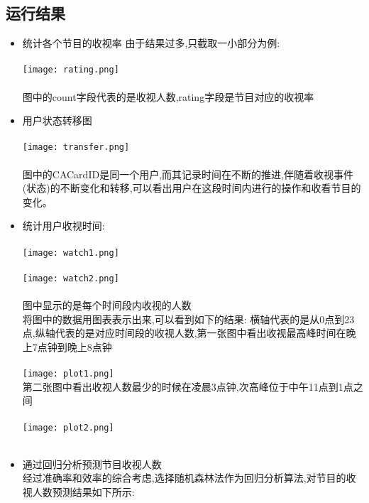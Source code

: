\documentclass{hitreport}
\begin{document}
\subsection{运行结果}
\begin{itemize}
  \item 统计各个节目的收视率
        由于结果过多,只截取一小部分为例:\\
        ~\\
        \texttt{[image: rating.png]}\\
        ~\\
        图中的count字段代表的是收视人数,rating字段是节目对应的收视率
  \item 用户状态转移图\\
        ~\\
        \texttt{[image: transfer.png]}\\
        ~\\
        图中的CACardID是同一个用户,而其记录时间在不断的推进,伴随着收视事件(状态)的不断变化和转移,可以看出用户在这段时间内进行的操作和收看节目的变化。
  \item 统计用户收视时间:\\
        ~\\
        \texttt{[image: watch1.png]}\\
        ~\\
        \texttt{[image: watch2.png]}\\
        ~\\
        图中显示的是每个时间段内收视的人数\\
        将图中的数据用图表表示出来,可以看到如下的结果:
        横轴代表的是从0点到23点,纵轴代表的是对应时间段的收视人数,第一张图中看出收视最高峰时间在晚上7点钟到晚上8点钟\\
        ~\\
        \texttt{[image: plot1.png]}\\
        第二张图中看出收视人数最少的时候在凌晨3点钟,次高峰位于中午11点到1点之间\\
        ~\\
        \texttt{[image: plot2.png]}\\
        ~\\
  \item 通过回归分析预测节目收视人数\\
        经过准确率和效率的综合考虑,选择随机森林法作为回归分析算法,对节目的收视人数预测结果如下所示:\\

\end{itemize}
\end{document}

